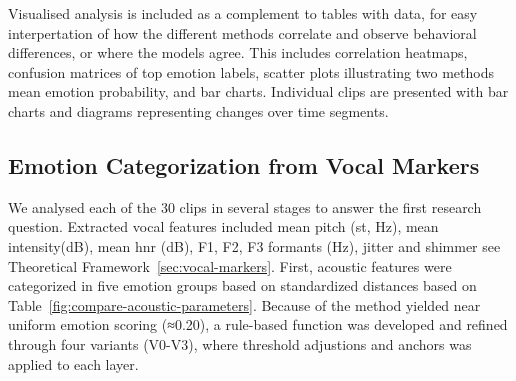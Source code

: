 Visualised analysis is included as a complement to tables with data, for easy interpertation of how the different methods correlate and observe behavioral differences, or where the models agree. 
This includes correlation heatmaps, confusion matrices of top emotion labels, scatter plots illustrating two methods mean emotion probability, and bar charts. 
Individual clips are presented with bar charts and diagrams representing changes over time segments. 



\subsection{Emotion Categorization from Vocal Markers}
\label{sec:method-data-an-voc}
We analysed each of the 30 clips in several stages to answer the first research question. Extracted vocal features included mean pitch (st, Hz), mean intensity(dB), mean hnr (dB), F1, F2, F3 formants (Hz), jitter and shimmer see Theoretical Framework~\ref{sec:vocal-markers}.
First, acoustic features were categorized in five emotion groups based on standardized distances based on Table~\ref{fig:compare-acoustic-parameters}. Because of the method yielded near uniform emotion scoring (≈0.20), a rule-based function was developed and refined through four variants (V0-V3), 
where threshold adjustions and anchors was applied to each layer.  


